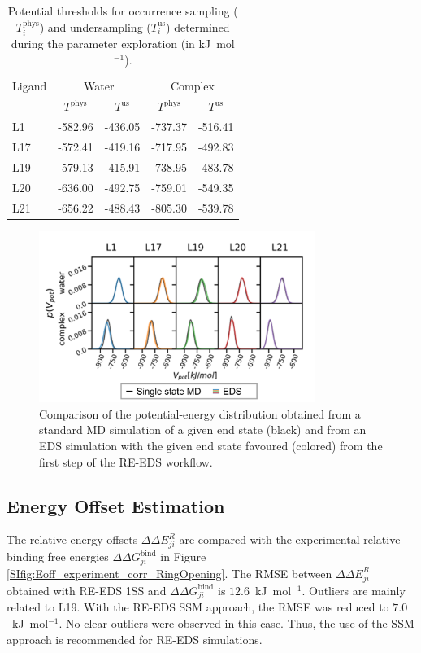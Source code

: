 \begin{table}[H]
\centering
\caption{Potential thresholds for occurrence sampling ($T_{i}^{\text{phys}}$) and undersampling ($T_{i}^{\text{us}}$) determined during the parameter exploration (in kJ~mol$^{-1}$).}
\label{SItab:RingCycleOpenin_PotentialTresholds}
\begin{tabular}{ l | c c |c c| }
 Ligand &\multicolumn{2}{c|}{Water} & \multicolumn{2}{c|}{Complex}\\ 
  & \multicolumn{1}{c}{$T^{\text{phys}}$}& \multicolumn{1}{c|}{$T^{\text{us}}$}&  \multicolumn{1}{c}{$T^{\text{phys}}$}& \multicolumn{1}{c|}{$T^{\text{us}}$} \\ 
 \hline
     L1  & -582.96 & -436.05 & -737.37 & -516.41\\ 
     L17 & -572.41 & -419.16 & -717.95 & -492.83\\
     L19 & -579.13 & -415.91 & -738.95 & -483.78\\
     L20 & -636.00 & -492.75 & -759.01 & -549.35\\
     L21 & -656.22 & -488.43 & -805.30 & -539.78\\
\end{tabular}
\end{table}

\begin{figure}[H]
\centering
     \includegraphics[width=0.8\textwidth]{fig/results/ringOpening/paramExploration/single_state_energy_sampling.png}
    \caption{Comparison of the potential-energy distribution obtained from a standard MD simulation of a given end state (black) and from an EDS simulation with the given end state favoured (colored) from the first step of the RE-EDS workflow.}
     \label{fig:CHK1_set2_stateOptimization_EnergyDistribution}
\end{figure}

\subsection{Energy Offset Estimation}
The relative energy offsets $\Delta \Delta E^R_{ji}$ are compared with the experimental relative binding free energies $\Delta \Delta G^\text{bind}_{ji}$ in Figure \ref{SIfig:Eoff_experiment_corr_RingOpening}. 
The RMSE between $\Delta \Delta E^R_{ji}$ obtained with RE-EDS 1SS and $\Delta \Delta G^\text{bind}_{ji}$ is $12.6$~kJ~mol$^{-1}$. Outliers are mainly related to L19.
With the RE-EDS SSM approach, the RMSE was reduced to $7.0$~kJ~mol$^{-1}$. No clear outliers were observed in this case. Thus, the use of the SSM approach is recommended for RE-EDS simulations.

